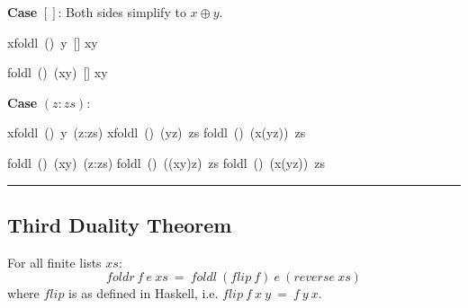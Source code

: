 \documentclass[twoside]{article}
\newenvironment{proof}{{\bf Proof:}}{\hfill\rule{2mm}{2mm}}
\begin{document}
\begin{proof}
\textbf{Case} $[]$: Both sides simplify to $x\oplus y$.

\begin{minipage}{0.4\textwidth}
\begin{calculation}
  x\oplus foldl~(\otimes)~y~[]
  x\oplus y
\end{calculation}
\end{minipage}%
\begin{minipage}{0.4\textwidth}
\begin{calculation}
  foldl~(\otimes)~(x\oplus y)~[]
  x\oplus y
\end{calculation}
\end{minipage}

\textbf{Case} $(z:zs)$:

\begin{minipage}{0.4\textwidth}
\begin{calculation}
  x\oplus foldl~(\otimes)~y~(z:zs)
  x\oplus foldl~(\otimes)~(y\otimes z)~zs
  foldl~(\otimes)~(x\oplus (y\otimes z))~zs
\end{calculation}
\end{minipage}%
\begin{minipage}{0.4\textwidth}
\begin{calculation}
  foldl~(\otimes)~(x\oplus y)~(z:zs)
  foldl~(\otimes)~((x\oplus y)\otimes z)~zs
  foldl~(\otimes)~(x\oplus (y\otimes z))~zs
\end{calculation}
\end{minipage}
\newline\hfill
\end{proof}
\subsection{Third Duality Theorem}
For all finite lists $xs$:
$$foldr~f~e~xs~=~foldl~(flip~f)~e~(reverse~xs)$$
where $flip$ is as defined in Haskell, i.e. $flip~f~x~y~=~f~y~x$.
\end{document}

